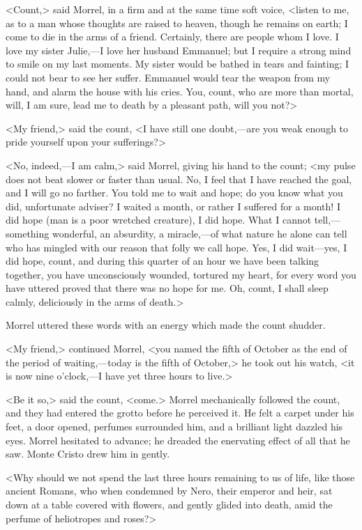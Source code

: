  <Count,> said Morrel, in a firm and at the same time soft voice, <listen to me, as to a man whose thoughts are raised to heaven, though he remains on earth; I come to die in the arms of a friend. Certainly, there are people whom I love. I love my sister Julie,—I love her husband Emmanuel; but I require a strong mind to smile on my last moments. My sister would be bathed in tears and fainting; I could not bear to see her suffer. Emmanuel would tear the weapon from my hand, and alarm the house with his cries. You, count, who are more than mortal, will, I am sure, lead me to death by a pleasant path, will you not?>

<My friend,> said the count, <I have still one doubt,—are you weak enough to pride yourself upon your sufferings?> 

 <No, indeed,—I am calm,> said Morrel, giving his hand to the count; <my pulse does not beat slower or faster than usual. No, I feel that I have reached the goal, and I will go no farther. You told me to wait and hope; do you know what you did, unfortunate adviser? I waited a month, or rather I suffered for a month! I did hope (man is a poor wretched creature), I did hope. What I cannot tell,—something wonderful, an absurdity, a miracle,—of what nature he alone can tell who has mingled with our reason that folly we call hope. Yes, I did wait—yes, I did hope, count, and during this quarter of an hour we have been talking together, you have unconsciously wounded, tortured my heart, for every word you have uttered proved that there was no hope for me. Oh, count, I shall sleep calmly, deliciously in the arms of death.> 

 Morrel uttered these words with an energy which made the count shudder. 

 <My friend,> continued Morrel, <you named the fifth of October as the end of the period of waiting,—today is the fifth of October,> he took out his watch, <it is now nine o'clock,—I have yet three hours to live.> 

 <Be it so,> said the count, <come.> Morrel mechanically followed the count, and they had entered the grotto before he perceived it. He felt a carpet under his feet, a door opened, perfumes surrounded him, and a brilliant light dazzled his eyes. Morrel hesitated to advance; he dreaded the enervating effect of all that he saw. Monte Cristo drew him in gently. 

 <Why should we not spend the last three hours remaining to us of life, like those ancient Romans, who when condemned by Nero, their emperor and heir, sat down at a table covered with flowers, and gently glided into death, amid the perfume of heliotropes and roses?> 


